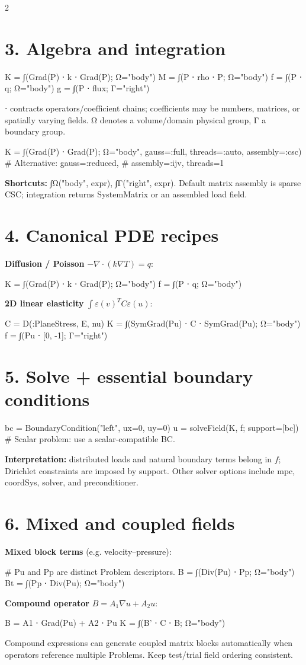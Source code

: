 \documentclass[a4paper,9pt]{extarticle}
\newcommand{\code}[1]{{\ttfamily\small #1}}
\begin{document}
\begin{multicols}{2}
\section{3. Algebra and integration}
\begin{julia}
K = ∫(Grad(P) ⋅ k ⋅ Grad(P); Ω="body")
M = ∫(P ⋅ rho ⋅ P; Ω="body")
f = ∫(P ⋅ q; Ω="body")
g = ∫(P ⋅ flux; Γ="right")
\end{julia}
\code{⋅} contracts operators/coefficient chains; coefficients may be numbers, matrices, or spatially varying fields. \code{Ω} denotes a volume/domain physical group, \code{Γ} a boundary group.
\begin{julia}
K = ∫(Grad(P) ⋅ Grad(P);
      Ω="body", gauss=:full,
      threads=:auto, assembly=:csc)
# Alternative: gauss=:reduced,
# assembly=:ijv, threads=1
\end{julia}
\textbf{Shortcuts:} \code{∫Ω("body", expr)}, \code{∫Γ("right", expr)}. Default matrix assembly is sparse CSC; integration returns \code{SystemMatrix} or an assembled load field.
\section{4. Canonical PDE recipes}
\textbf{Diffusion / Poisson} $-\nabla\cdot(k\nabla T)=q$:
\begin{julia}
K = ∫(Grad(P) ⋅ k ⋅ Grad(P); Ω="body")
f = ∫(P ⋅ q; Ω="body")
\end{julia}
\textbf{2D linear elasticity} $\int\varepsilon(v)^TC\varepsilon(u)$:
\begin{julia}
C = D(:PlaneStress, E, nu)
K = ∫(SymGrad(Pu) ⋅ C ⋅ SymGrad(Pu);
      Ω="body")
f = ∫(Pu ⋅ [0, -1]; Γ="right")
\end{julia}
\columnbreak
\section{5. Solve + essential boundary conditions}
\begin{julia}
bc = BoundaryCondition("left", ux=0, uy=0)
u = solveField(K, f; support=[bc])
# Scalar problem: use a scalar-compatible BC.
\end{julia}
\textbf{Interpretation:} distributed loads and natural boundary terms belong in $f$; Dirichlet constraints are imposed by \code{support}. Other solver options include \code{mpc}, \code{coordSys}, \code{solver}, and \code{preconditioner}.
\section{6. Mixed and coupled fields}
\textbf{Mixed block terms} (e.g. velocity--pressure):
\begin{julia}
# Pu and Pp are distinct Problem descriptors.
B = ∫(Div(Pu) ⋅ Pp; Ω="body")
Bt = ∫(Pp ⋅ Div(Pu); Ω="body")
\end{julia}
\textbf{Compound operator} $B=A_1\nabla u+A_2u$:
\begin{julia}
B = A1 ⋅ Grad(Pu) + A2 ⋅ Pu
K = ∫(B' ⋅ C ⋅ B; Ω="body")
\end{julia}
Compound expressions can generate coupled matrix blocks automatically when operators reference multiple \code{Problem}s. Keep test/trial field ordering consistent.

\end{multicols}
\end{document}
